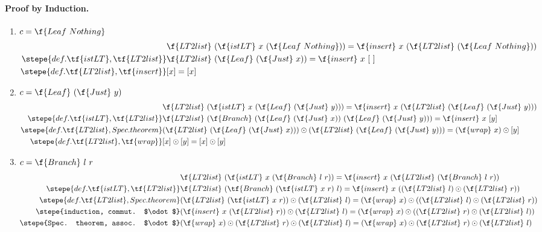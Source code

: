 \documentclass[a4paper,11pt]{llncs}
\begin{document}
\paragraph{Proof by Induction.}

\begin{enumerate}
\item $c = \f{Leaf\ Nothing}$
\begin{align*}
  & \f{LT2list}\ (\f{istLT}\  x\ (\f{Leaf\ Nothing})) = \f{insert}\
  x\ (\f{LT2list}\ (\f{Leaf\ Nothing}))\\
  \stepe{def. \tf{istLT}, \tf{LT2list}}
  & \f{LT2list}\ (\f{Leaf}\ (\f{Just}\ x)) = \f{insert}\
  x\ [\ ]\\
  \stepe{def. \tf{LT2list}, \tf{insert}} 
  & [x] = [x]
\end{align*}

\item $c = \f{Leaf}\ (\f{Just}\ y)$
\begin{align*}
  & \f{LT2list}\ (\f{istLT}\  x\ (\f{Leaf}\ (\f{Just}\ y))) = \f{insert}\
  x\ (\f{LT2list}\ (\f{Leaf}\ (\f{Just}\ y)))\\
  \stepe{def. \tf{istLT}, \tf{LT2list}}
  & \f{LT2list}\ (\f{Branch}\ (\f{Leaf}\ (\f{Just}\ x))\ (\f{Leaf}\
  (\f{Just}\ y))) = \f{insert}\  x\ [y]\\
  \stepe{def. \tf{LT2list}, Spec. theorem}
  & (\f{LT2list}\ (\f{Leaf}\ (\f{Just}\ x))) \odot (\f{LT2list}\ (\f{Leaf}\
  (\f{Just}\ y))) = (\f{wrap}\ x) \odot [y]\\
  \stepe{def. \tf{LT2list}, \tf{wrap}}
  & [x] \odot [y] = [x] \odot [y]
\end{align*}


\item $c = \f{Branch}\ l\ r$
\begin{align*}
  & \f{LT2list}\ (\f{istLT}\ x\ (\f{Branch}\ l\ r)) = \f{insert}\ x\
  (\f{LT2list}\ (\f{Branch}\ l\ r))\\
  \stepe{def. \tf{istLT}, \tf{LT2list}} 
  & \f{LT2list}\ (\tf{Branch}\ (\tf{istLT}\ x\ r)\ l) =
  \f{insert}\ x\ ((\f{LT2list}\ l) \odot (\f{LT2list}\ r))\\
  \stepe{def. \tf{LT2list}, Spec. theorem} 
  & (\f{LT2list}\ (\tf{istLT}\ x\ r)) \odot (\f{LT2list}\ l) =
  (\f{wrap}\ x) \odot ((\f{LT2list}\ l) \odot (\f{LT2list}\ r))\\
  \stepe{induction, commut. $\odot$}
  & (\f{insert}\ x\ (\f{LT2list}\ r)) \odot (\f{LT2list}\ l) =
  (\f{wrap}\ x) \odot ((\f{LT2list}\ r) \odot (\f{LT2list}\ l)) \\
  \stepe{Spec. theorem, assoc. $\odot$}
   & (\f{wrap}\ x) \odot (\f{LT2list}\ r) \odot (\f{LT2list}\ l) = 
  (\f{wrap}\ x) \odot (\f{LT2list}\ r) \odot (\f{LT2list}\ l) \\
\end{align*}
\end{enumerate}
\end{document}
